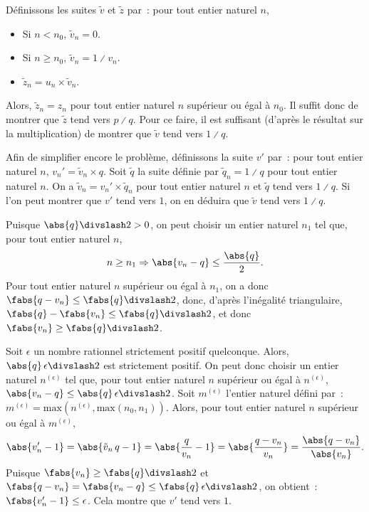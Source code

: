     Définissons les suites $\tilde{v}$ et $\tilde{z}$ par : pour tout entier naturel $n$, 
    \begin{itemize}[nosep]
        \item Si $n < n_0$, $\tilde{v}_n = 0$.
        \item Si $n \geq n_0$, $\tilde{v}_n = 1 \divslash v_n$.
        \item $\tilde{z}_n = u_n \times \tilde{v}_n$.
    \end{itemize}
    Alors, $\tilde{z}_n = z_n$ pour tout entier naturel $n$ supérieur ou égal à $n_0$. 
    Il suffit donc de montrer que $\tilde{z}$ tend vers $p \divslash q$.
    Pour ce faire, il est suffisant (d'après le résultat sur la multiplication) de montrer que $\tilde{v}$ tend vers $1 \divslash q$.

    Afin de simplifier encore le problème, définissons la suite $v'$ par : pour tout entier naturel $n$, $v_n' = \tilde{v}_n \times q$.
    Soit $\tilde{q}$ la suite définie par $\tilde{q}_n = 1 \divslash q$ pour tout entier naturel $n$. 
    On a $\tilde{v}_n = v_n' \times \tilde{q}_n$ pour tout entier naturel $n$ et $\tilde{q}$ tend vers $1 \divslash q$. 
    Si l'on peut montrer que $v'$ tend vers $1$, on en déduira que $\tilde{v}$ tend vers $1 \divslash q$.

    Puisque $\abs{q} \divslash 2 > 0$, on peut choisir un entier naturel $n_1$ tel que, pour tout entier naturel $n$, 
    \begin{equation*}
        n \geq n_1 \Rightarrow \abs{v_n - q} \leq \frac{\abs{q}}{2} .
    \end{equation*}
    Pour tout entier naturel $n$ supérieur ou égal à $n_1$, on a donc $\fabs{q - v_n} \leq \fabs{q} \divslash 2$, donc, d'après l'inégalité triangulaire, $\fabs{q} - \fabs{v_n} \leq \fabs{q} \divslash 2$, et donc $\fabs{v_n} \geq \fabs{q} \divslash 2$. 

    Soit $\epsilon$ un nombre rationnel strictement positif quelconque. 
    Alors, $\abs{q} \, \epsilon \divslash 2$ est strictement positif.
    On peut donc choisir un entier naturel $n^{(\epsilon)}$ tel que, pour tout entier naturel $n$ supérieur ou égal à $n^{(\epsilon)}$, $\abs{v_n - q} \leq \abs{q} \, \epsilon \divslash 2$. 
    Soit $m^{(\epsilon)}$ l'entier naturel défini par : $m^{(\epsilon)} = \mathrm{max} \left( n^{(\epsilon)}, \mathrm{max} \left( n_0, n_1 \right) \right)$. 
    Alors, pour tout entier naturel $n$ supérieur ou égal à $m^{(\epsilon)}$, 
    \begin{equation*}
        \abs{v'_n - 1} 
            = \abs{\tilde{v}_n \, q - 1}
            = \abs{\frac{q}{v_n} - 1}
            = \abs{\frac{q - v_n}{v_n}}
            = \frac{\abs{q - v_n}}{\abs{v_n}} .
    \end{equation*}
    Puisque $\fabs{v_n} \geq \fabs{q} \divslash 2$ et $\fabs{q - v_n} = \fabs{v_n - q} \leq \fabs{q} \, \epsilon \divslash 2$, on obtient : $\fabs{v'_n - 1} \leq \epsilon$.
    Cela montre que $v'$ tend vers $1$.
    
